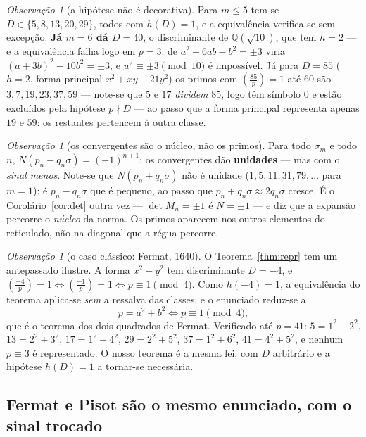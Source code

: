 \documentclass[11pt,a4paper]{article}
\theoremstyle{plain}
\theoremstyle{definition}
\theoremstyle{remark}
\newtheorem{obs}[teorema]{Observação}
\newcommand{\Q}{\mathbb{Q}}
\begin{document}
\begin{obs}[a hipótese não é decorativa]
Para $m \leq 5$ tem-se $D \in \{5,8,13,20,29\}$, todos com $h(D)=1$, e a equivalência verifica-se
sem excepção. \textbf{Já $m=6$ dá $D=40$}, o discriminante de $\Q(\sqrt{10})$, que tem $h=2$ --- e a
equivalência falha logo em $p=3$: de $a^2+6ab-b^2=\pm3$ viria $(a+3b)^2-10b^2=\pm3$, e
$u^2 \equiv \pm3 \pmod{10}$ é impossível. Já para $D = 85$ ($h=2$, forma principal $x^2+xy-21y^2$) os primos com
$\left(\frac{85}{p}\right)=1$ até $60$ são $3,7,19,23,37,59$ --- note-se que $5$ e $17$ \emph{dividem}
$85$, logo têm símbolo $0$ e estão excluídos pela hipótese $p\nmid D$ --- ao passo que a forma
principal representa apenas $19$ e $59$: os restantes pertencem à outra classe.
\end{obs}

\begin{obs}[os convergentes são o núcleo, não os primos]
Para todo $\sigma_m$ e todo $n$, $N(p_n - q_n\sigma) = (-1)^{n+1}$: os convergentes dão
\textbf{unidades} --- mas com o \emph{sinal menos}. Note-se que $N(p_n+q_n\sigma)$ não é unidade
($1,5,11,31,79,\dots$ para $m=1$): é $p_n - q_n\sigma$ que é pequeno, ao passo que
$p_n+q_n\sigma \approx 2q_n\sigma$ cresce.
É o Corolário~\ref{cor:det} outra vez --- $\det M_n = \pm1$ é $N = \pm1$ --- e diz que a expansão
percorre o \emph{núcleo} da norma. Os primos aparecem nos outros elementos do reticulado, não na
diagonal que a régua percorre.
\end{obs}

\begin{obs}[o caso clássico: Fermat, 1640]\label{obs:fermat}
O Teorema~\ref{thm:repr} tem um antepassado ilustre. A forma $x^2+y^2$ tem discriminante $D=-4$, e
$\left(\frac{-4}{p}\right)=1 \iff \left(\frac{-1}{p}\right)=1 \iff p\equiv1\pmod 4$. Como
$h(-4)=1$, a equivalência do teorema aplica-se \emph{sem} a ressalva das classes, e o enunciado
reduz-se a
\[
  p = a^2+b^2 \iff p \equiv 1 \pmod 4 ,
\]
que é o teorema dos dois quadrados de Fermat. Verificado até $p=41$: $5=1^2+2^2$, $13=2^2+3^2$,
$17=1^2+4^2$, $29=2^2+5^2$, $37=1^2+6^2$, $41=4^2+5^2$, e nenhum $p\equiv3$ é representado. O nosso
teorema é a mesma lei, com $D$ arbitrário e a hipótese $h(D)=1$ a tornar-se necessária.
\end{obs}

\subsection{Fermat e Pisot são o mesmo enunciado, com o sinal trocado}\label{sec:dual}
\end{document}
